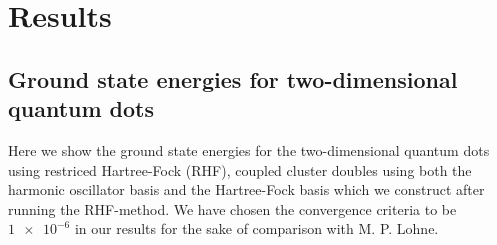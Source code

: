 \documentclass[
    a4paper, aps, twocolumn, floatfix, superscriptaddress,
    nofootinbib]{revtex4-1}
\newcommand{\1}{\mathds{1}}
\begin{document}
\section{Results}

    \subsection{Ground state energies for two-dimensional quantum dots}
        Here we show the ground state energies for the two-dimensional quantum
        dots using restriced Hartree-Fock (RHF), coupled cluster doubles using
        both the harmonic oscillator basis and the Hartree-Fock basis which we
        construct after running the RHF-method. We have chosen the convergence
        criteria to be $\num{1e-6}$ in our results for the sake of comparison
        with M. P. Lohne\cite{lohne2011ab}.
\end{document}
